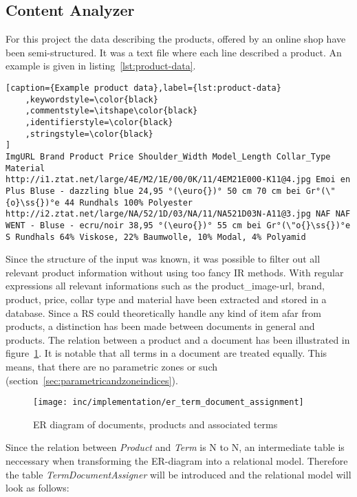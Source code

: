
\subsection{Content Analyzer}
\label{sec:content-analyzer}
For this project the data describing the products, offered by an online shop have been semi-structured.
It was a text file where each line described a product.
An example is given in listing~\ref{lst:product-data}.

\begin{lstlisting}[caption={Example product data},label={lst:product-data}
    ,keywordstyle=\color{black}
    ,commentstyle=\itshape\color{black}
    ,identifierstyle=\color{black}
    ,stringstyle=\color{black}
]
ImgURL Brand Product Price Shoulder_Width Model_Length Collar_Type Material
http://i1.ztat.net/large/4E/M2/1E/00/0K/11/4EM21E000-K11@4.jpg Emoi en Plus Bluse - dazzling blue 24,95 °(\euro{})° 50 cm 70 cm bei Gr°(\"{o}\ss{})°e 44 Rundhals 100% Polyester
http://i2.ztat.net/large/NA/52/1D/03/NA/11/NA521D03N-A11@3.jpg NAF NAF WENT - Bluse - ecru/noir 38,95 °(\euro{})° 55 cm bei Gr°(\"o{}\ss{})°e S Rundhals 64% Viskose, 22% Baumwolle, 10% Modal, 4% Polyamid
\end{lstlisting}

\noindent
Since the structure of the input was known, it was possible to filter out all relevant product information without using too fancy IR methods.
With regular expressions all relevant informations such as the product\_image-url, brand, product, price, collar type and material have been extracted and stored in a database.
Since a RS could theoretically handle any kind of item afar from products, a distinction has been made between documents in general and products.
The relation between a product and a document has been illustrated in figure~\ref{fig:ertermdocumentassignment}.
It is notable that all terms in a document are treated equally.
This means, that there are no parametric zones or such (section~\ref{sec:parametricandzoneindices}).
\begin{figure}[h]
    \center
    \texttt{[image: inc/implementation/er\_term\_document\_assignment]}
    \caption{ER diagram of documents, products and associated terms}
    \label{fig:ertermdocumentassignment}
\end{figure}
Since the relation between \textit{Product} and \textit{Term} is N to N, an intermediate table is neccessary when transforming the ER-diagram into a relational model.
Therefore the table \textit{TermDocumentAssigner} will be introduced and the relational model will look as follows:

